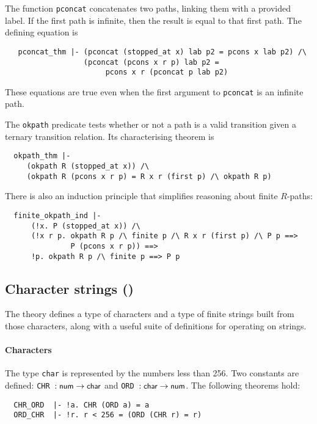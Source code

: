 The function \texttt{pconcat} concatenates two paths, linking them
with a provided label.  If the first path is infinite, then the result
is equal to that first path.  The defining equation is
{\small
\begin{verbatim}
   pconcat_thm |- (pconcat (stopped_at x) lab p2 = pcons x lab p2) /\
                  (pconcat (pcons x r p) lab p2 =
                       pcons x r (pconcat p lab p2)
\end{verbatim}
}
\noindent
These equations are true even when the first argument to
\texttt{pconcat} is an infinite path.

The \texttt{okpath} predicate tests whether or not a path is a valid
transition given a ternary transition relation.  Its characterising
theorem is
{\small
\begin{verbatim}
  okpath_thm |-
     (okpath R (stopped_at x)) /\
     (okpath R (pcons x r p) = R x r (first p) /\ okpath R p)
\end{verbatim}
}

\noindent
There is also an induction principle that simplifies reasoning about
finite $R$-paths:
%
{\small
\begin{verbatim}
  finite_okpath_ind |-
      (!x. P (stopped_at x)) /\
      (!x r p. okpath R p /\ finite p /\ R x r (first p) /\ P p ==>
               P (pcons x r p)) ==>
      !p. okpath R p /\ finite p ==> P p
\end{verbatim}
}


\subsection{Character strings ()}

The theory  defines a type of characters and a type
of finite strings built from those characters, along with a useful suite of
definitions for operating on strings.

\paragraph {Characters}

The type \verb+char+ is represented by the numbers less than 256. Two
constants are defined: {\small\verb+CHR +}$: \mbox{\small{\textbf{\sf{num}}}}\to\mbox{\small{\textbf{\sf{char}}}}$ and
{\small\verb+ORD +}$: \mbox{\small{\textbf{\sf{char}}}}\to\mbox{\small{\textbf{\sf{num}}}}$. The following theorems
hold:
{\small
\begin{verbatim}
  CHR_ORD  |- !a. CHR (ORD a) = a
  ORD_CHR  |- !r. r < 256 = (ORD (CHR r) = r)
\end{verbatim}
}

